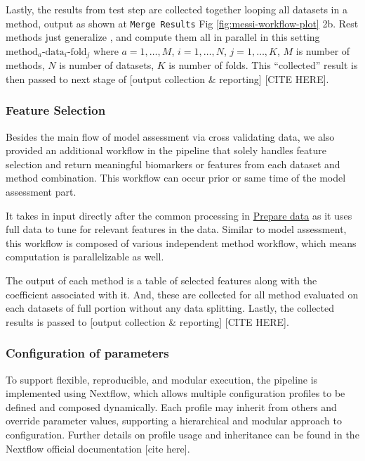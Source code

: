 \documentclass[
]{article}
\begin{document}
Lastly, the results from test step are collected together looping all datasets in a method, output as shown at \texttt{Merge\ Results} Fig \ref{fig:messi-workflow-plot} 2b. Rest methods just generalize , and compute them all in parallel in this setting \(\text{method}_a\text{-data}_i\text{-fold}_j\) where \(a = 1, \dots, M\), \(i = 1, \dots, N\), \(j = 1, \dots, K\), \(M\) is number of methods, \(N\) is number of datasets, \(K\) is number of folds. This ``collected'' result is then passed to next stage of {[}output collection \& reporting{]} {[}CITE HERE{]}.

\hypertarget{feature-selection}{%
\subsubsection{Feature Selection}\label{feature-selection}}

Besides the main flow of model assessment via cross validating data, we also provided an additional workflow in the pipeline that solely handles feature selection and return meaningful biomarkers or features from each dataset and method combination. This workflow can occur prior or same time of the model assessment part.

It takes in input directly after the common processing in \protect\hyperlink{prepare-data}{Prepare data} as it uses full data to tune for relevant features in the data. Similar to model assessment, this workflow is composed of various independent method workflow, which means computation is parallelizable as well.

The output of each method is a table of selected features along with the coefficient associated with it. And, these are collected for all method evaluated on each datasets of full portion without any data splitting. Lastly, the collected results is passed to {[}output collection \& reporting{]} {[}CITE HERE{]}.

\hypertarget{configuration-of-parameters}{%
\subsubsection{Configuration of parameters}\label{configuration-of-parameters}}

To support flexible, reproducible, and modular execution, the pipeline is implemented using Nextflow, which allows multiple configuration profiles to be defined and composed dynamically. Each profile may inherit from others and override parameter values, supporting a hierarchical and modular approach to configuration. Further details on profile usage and inheritance can be found in the Nextflow official documentation {[}cite here{]}.
\end{document}
